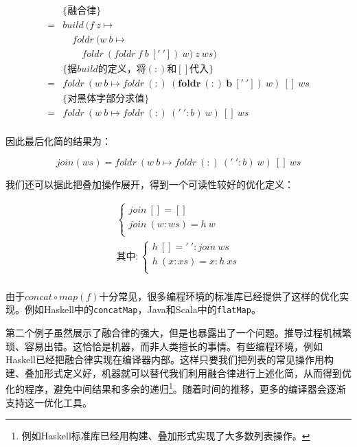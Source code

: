\documentclass{article}
\begin{document}
\begin{example}
\[\begin{array}{rl}
  & \{\text{融合律}\} \\
= & build\ (f\ z \mapsto \\
  & \quad foldr\ (w\ b \mapsto \\
  & \quad \quad foldr\ (foldr\ f\ b\ ['\ '])\ w)\ z\ ws) \\

  & \{\text{据$build$的定义，将$(:)$和$[]$代入}\} \\
= & foldr\ (w\ b \mapsto foldr\ (:)\ \pmb{(foldr\ (:)\ b\ ['\ '])}\ w)\ []\ ws \\

  & \{\text{对黑体字部分求值}\} \\
= & foldr\ (w\ b \mapsto foldr\ (:)\ ('\ ' : b)\ w)\ []\ ws \\
\end{array} \]

因此最后化简的结果为：

\[
join(ws) = foldr\ (w\ b \mapsto foldr\ (:)\ ('\ ' : b)\ w)\ []\ ws
\]

我们还可以据此把叠加操作展开，得到一个可读性较好的优化定义：

\[
\begin{array}{l}
\begin{cases}
join\ [] = [] \\
join\ (w:ws) = h\ w \\
\end{cases} \\
\text{其中}: \begin{cases}
             h\ [] = '\ ' : join\ ws \\
             h\ (x:xs) = x : h\ xs \\
             \end{cases} \\
\end{array}
\]

由于$concat \circ map(f)$十分常见，很多编程环境的标准库已经提供了这样的优化实现。例如Haskell中的\texttt{concatMap}，Java和Scala中的\texttt{flatMap}。
\end{example}

第二个例子虽然展示了融合律的强大，但是也暴露出了一个问题。推导过程机械繁琐、容易出错。这恰恰是机器，而非人类擅长的事情。有些编程环境，例如Haskell已经把融合律实现在编译器内部\cite{GLPJ-1993}。这样只要我们把列表的常见操作用构建、叠加形式定义好，机器就可以替代我们利用融合律进行上述化简，从而得到优化的程序，避免中间结果和多余的递归\footnote{例如Haskell标准库已经用构建、叠加形式实现了大多数列表操作。}。随着时间的推移，更多的编译器会逐渐支持这一优化工具。
\end{document}
